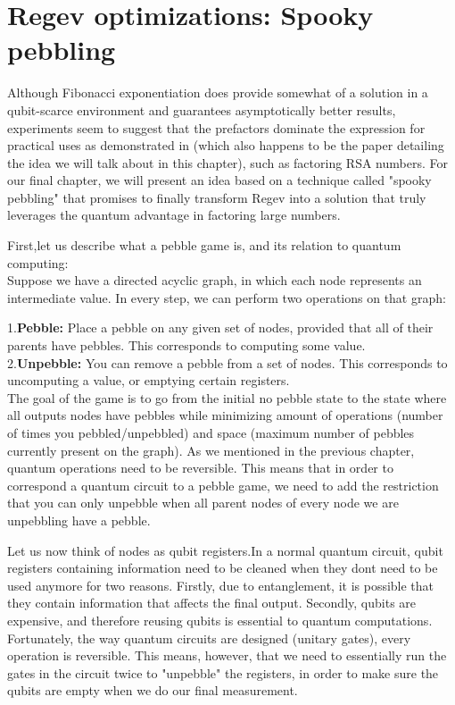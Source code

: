 \chapter{Regev optimizations: Spooky pebbling}

Although Fibonacci exponentiation does provide somewhat of a solution in a qubit-scarce environment and guarantees asymptotically better results, experiments seem to suggest that the prefactors dominate the expression for practical uses as demonstrated in \cite{KahanamokuMeyerRagavanVanKirk2024} (which also happens to be the paper detailing the idea we will talk about in this chapter), such as factoring RSA numbers. For our final chapter, we will present an idea based on a technique called "spooky pebbling" that promises to finally transform Regev into a solution that truly leverages the quantum advantage in factoring large numbers.

First,let us describe what a pebble game is, and its relation to quantum computing:\\
Suppose we have a directed acyclic graph, in which each node represents an intermediate value. In every step, we can perform two operations on that graph:

1.\textbf{Pebble:} Place a pebble on any given set of nodes, provided that all of their parents have pebbles. This corresponds to computing some value.\\
2.\textbf{Unpebble:} You can remove a pebble from a set of nodes. This corresponds to uncomputing a value, or emptying certain registers.\\

The goal of the game is to go from the initial no pebble state to the state where all outputs nodes have pebbles while minimizing amount of operations (number of times you pebbled/unpebbled) and space (maximum number of pebbles currently present on the graph). As we mentioned in the previous chapter, quantum operations need to be reversible. This means that in order to correspond a quantum circuit to a pebble game, we need to add the restriction that you can only unpebble when all parent nodes of every node we are unpebbling have a pebble.

Let us now think of nodes as qubit registers.In a normal quantum circuit, qubit registers containing information need to be cleaned when they dont need to be used anymore for two reasons. Firstly, due to entanglement, it is possible that they contain information that affects the final output. Secondly, qubits are expensive, and therefore reusing qubits is essential to quantum computations. Fortunately, the way quantum circuits are designed (unitary gates), every operation is reversible. This means, however, that we need to essentially run the gates in the circuit twice to "unpebble" the registers, in order to make sure the qubits are empty when we do our final measurement.

